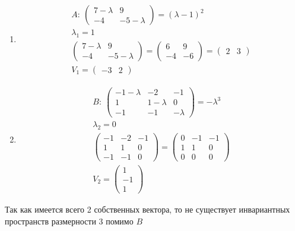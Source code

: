 		\begin{enumerate}
		\item 
			\begin{gather*}
				A:\
				\begin{pmatrix}
					7-\lambda & 9\\
					-4 & -5-\lambda	
				\end{pmatrix}
				= (\lambda -1)^2\\
				\lambda_1 = 1\\
				\begin{pmatrix}
					7-\lambda & 9\\
					-4 & -5-\lambda	
				\end{pmatrix}
				=
				\begin{pmatrix}
					6 & 9\\
					-4 & -6	
				\end{pmatrix}
				=
				\begin{pmatrix}
					2 & 3
				\end{pmatrix}\\
				V_1 = 
				\begin{pmatrix}
					-3 & 2
				\end{pmatrix}
			\end{gather*}
		\item 
			\begin{gather*}
				B:\
				\begin{pmatrix}
					-1-\lambda & -2 & -1\\
					1 & 1 - \lambda & 0\\
					-1 & -1 & -\lambda
				\end{pmatrix}
				=
				-\lambda^3\\
				\lambda_2 = 0\\
				\begin{pmatrix}
					-1 & -2 & -1\\
					1 & 1 & 0\\
					-1 & -1 & 0
				\end{pmatrix}
				=
				\begin{pmatrix}
					0 & -1 & -1\\
					1 & 1 & 0\\
					0 & 0 & 0
				\end{pmatrix}\\
				V_2 = 
				\begin{pmatrix}
					1 \\ -1 \\ 1
				\end{pmatrix}
			\end{gather*}
		\end{enumerate}
		Так как имеется всего 2 собственных вектора, то не существует инвариантных пространств размерности $3$ помимо $B$\\
		
